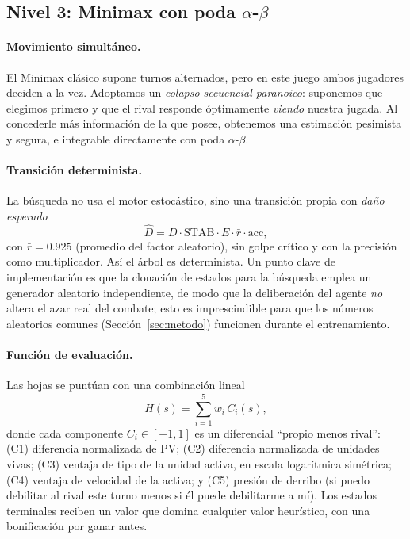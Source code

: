\documentclass[11pt]{article}
\begin{document}
\subsection{Nivel 3: Minimax con poda $\alpha$-$\beta$}
\label{sec:n3}

\paragraph{Movimiento simultáneo.} El Minimax clásico supone turnos alternados,
pero en este juego ambos jugadores deciden a la vez. Adoptamos un \emph{colapso
secuencial paranoico}: suponemos que elegimos primero y que el rival responde
óptimamente \emph{viendo} nuestra jugada. Al concederle más información de la que
posee, obtenemos una estimación pesimista y segura, e integrable directamente con
poda $\alpha$-$\beta$.

\paragraph{Transición determinista.} La búsqueda no usa el motor estocástico, sino
una transición propia con \emph{daño esperado}
\begin{equation}
  \label{eq:dhat}
  \hat{D} = D \cdot \text{STAB} \cdot E \cdot \bar{r} \cdot \text{acc},
\end{equation}
con $\bar{r}{=}0.925$ (promedio del factor aleatorio), sin golpe crítico y con la
precisión como multiplicador. Así el árbol es determinista. Un punto clave de
implementación es que la clonación de estados para la búsqueda emplea un generador
aleatorio independiente, de modo que la deliberación del agente \emph{no} altera
el azar real del combate; esto es imprescindible para que los números aleatorios
comunes (Sección~\ref{sec:metodo}) funcionen durante el entrenamiento.

\paragraph{Función de evaluación.} Las hojas se puntúan con una combinación
lineal
\begin{equation}
  \label{eq:eval}
  H(s) = \sum_{i=1}^{5} w_i\, C_i(s),
\end{equation}
donde cada componente $C_i \in [-1,1]$ es un diferencial ``propio menos rival'':
(C1) diferencia normalizada de PV; (C2) diferencia normalizada de unidades vivas;
(C3) ventaja de tipo de la unidad activa, en escala logarítmica simétrica;
(C4) ventaja de velocidad de la activa; y (C5) presión de derribo (si puedo
debilitar al rival este turno menos si él puede debilitarme a mí). Los estados
terminales reciben un valor que domina cualquier valor heurístico, con una
bonificación por ganar antes.
\end{document}
